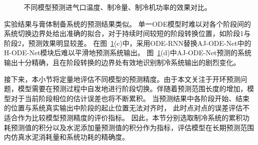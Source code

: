 \begin{figure}
    \caption{不同模型预测进气口温度、制冷量、制冷机功率的效果对比。} %
    \label{fig:4_models}  %
    \end{figure}
实验结果与膏体制备系统的预测结果类似。
单一ODE模型时难以对各个阶段间的系统切换边界处给出准确的拟合，对于持续时间较短的阶段转换位置，如阶段1与阶段2，预测效果明显较差。
在图~\ref{fig:4_models}(c)中，采用ODE-RNN替换AJ-ODE-Net中的H-ODE-Net模块后难以平滑地预测系统输出。
图~\ref{fig:4_models}(d)中AJ-ODE-Net预测的系统输出十分精确，且在阶段转换的边界处有效地识别制冷系统输出的剧烈变化。

接下来，本小节将定量地评估不同模型的预测精度。由于本文关注于开环预测问题，模型需要在预测过程中自发地进行阶段切换。伴随着预测范围长度的增加，模型对于当前阶段相位的估计误差也将不断累积。
当预测结果中各阶段开始、结束的位置与系统真实输出中阶段的起止位置无法对齐时，
此时点对点的误差评估不适合作为比较模型预测精度的评价指标。
因此，本节分别选取制冷系统的累积功耗预测值的积分以及水泥添加量预测值的积分作为指标，评估模型在长期预测范围内仿真水泥消耗量和系统功耗的精确度。

